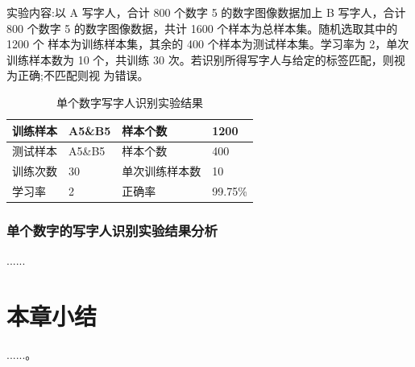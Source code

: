 实验内容:以 A 写字人，合计 800 个数字 5 的数字图像数据加上 B 写字人，合计 800 个数字 5 的数字图像数据，共计 1600 个样本为总样本集。随机选取其中的 1200 个 样本为训练样本集，其余的 400 个样本为测试样本集。学习率为 2，单次训练样本数为 10 个，共训练 30 次。若识别所得写字人与给定的标签匹配，则视为正确;不匹配则视 为错误。

\begin{table}[!hpb]
  \centering
  \caption[指向一个表格的表目录索引]
    {单个数字写字人识别实验结果}
  \label{tab:firstone}
  \begin{tabular}{C{8em}|C{4em}|C{10em}|C{6em}} \hline
    训练样本 & A5\&B5  & 样本个数      & 1200 \\ \hline
    测试样本 & A5\&B5  & 样本个数      & 400 \\ \hline
    训练次数 & 30      & 单次训练样本数 & 10   \\ \hline
    学习率   & 2       & 正确率        & 99.75\% \\ \hline
  \end{tabular}
\end{table}

\subsubsection{单个数字的写字人识别实验结果分析}
......

\section{本章小结}
......。